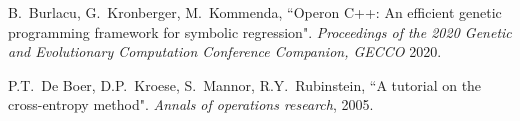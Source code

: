 \documentclass[11pt]{article}
\begin{document}
\begin{thebibliography}{10}
	B.~Burlacu, G.~Kronberger, M.~Kommenda, ``Operon C++: An efficient genetic programming framework for symbolic regression". {\em Proceedings of the 2020 Genetic and Evolutionary Computation Conference Companion, GECCO}  2020.
	
	P.T.~De Boer, D.P.~Kroese, S.~Mannor, R.Y.~Rubinstein, ``A tutorial on the cross-entropy method". {\em Annals of operations research}, 2005.
	
\end{thebibliography}
\end{document}
